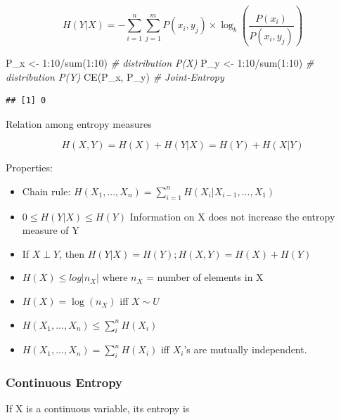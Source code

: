 \documentclass[
]{book}
\newenvironment{Shaded}{\begin{snugshade}}{\end{snugshade}}
\newcommand{\CommentTok}[1]{\textcolor[rgb]{0.56,0.35,0.01}{\textit{#1}}}
\newcommand{\DecValTok}[1]{\textcolor[rgb]{0.00,0.00,0.81}{#1}}
\newcommand{\FunctionTok}[1]{\textcolor[rgb]{0.00,0.00,0.00}{#1}}
\newcommand{\NormalTok}[1]{#1}
\newcommand{\OtherTok}[1]{\textcolor[rgb]{0.56,0.35,0.01}{#1}}
\newcommand{\SpecialCharTok}[1]{\textcolor[rgb]{0.00,0.00,0.00}{#1}}
\providecommand{\tightlist}{%
  \setlength{\itemsep}{0pt}\setlength{\parskip}{0pt}}
\begin{document}
\[
H(Y|X) = - \sum_{i=1}^n \sum_{j = 1}^m P(x_i, y_j) \times \log_b(\frac{P(x_i)}{P(x_i,y_j)})
\]

\begin{Shaded}
\begin{Highlighting}[]
\NormalTok{P\_x }\OtherTok{\textless{}{-}} \DecValTok{1}\SpecialCharTok{:}\DecValTok{10}\SpecialCharTok{/}\FunctionTok{sum}\NormalTok{(}\DecValTok{1}\SpecialCharTok{:}\DecValTok{10}\NormalTok{) }\CommentTok{\# distribution P(X)}
\NormalTok{P\_y }\OtherTok{\textless{}{-}} \DecValTok{1}\SpecialCharTok{:}\DecValTok{10}\SpecialCharTok{/}\FunctionTok{sum}\NormalTok{(}\DecValTok{1}\SpecialCharTok{:}\DecValTok{10}\NormalTok{) }\CommentTok{\# distribution P(Y)}
\FunctionTok{CE}\NormalTok{(P\_x, P\_y) }\CommentTok{\# Joint{-}Entropy}
\end{Highlighting}
\end{Shaded}

\begin{verbatim}
## [1] 0
\end{verbatim}

Relation among entropy measures

\[
H(X,Y) = H(X) + H(Y|X) = H(Y) + H(X|Y)
\]

Properties:

\begin{itemize}
\tightlist
\item
  Chain rule: \(H(X_1, ..., X_n) = \sum_{i=1}^n H(X_i | X_{i-1},...,X_1)\)
\item
  \(0 \le H(Y|X) \le H(Y)\) Information on X does not increase the entropy measure of Y
\item
  If \(X \perp Y\), then \(H(Y|X) = H(Y); H(X,Y) = H(X) + H(Y)\)
\item
  \(H(X) \le log |n_X|\) where \(n_X\) = number of elements in X
\item
  \(H(X) = \log (n_X)\) iff \(X \sim U\)
\item
  \(H(X_1,...,X_n) \le \sum_i^n H(X_i)\)
\item
  \(H(X_1,...,X_n) = \sum_i^n H(X_i)\) iff \(X_i\)'s are mutually independent.
\end{itemize}

\hypertarget{continuous-entropy}{%
\subsubsection{Continuous Entropy}\label{continuous-entropy}}

If X is a continuous variable, its entropy is
\end{document}
